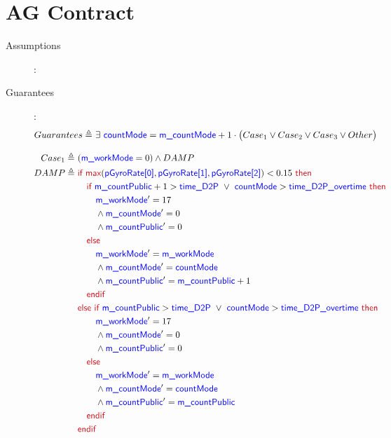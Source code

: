 \documentclass[fleqn,a4paper]{article}
\newcommand\Var[1]{\textcolor{blue}{\textsf{#1}}}
\newcommand\syntax[1]{\textcolor[RGB]{202,12,22}{\textsf{#1}}}
\newcommand\definedby{\triangleq}
\begin{document}
\newpage

\section{AG Contract}

\begin{description}

\item[Assumptions]: 

\item[Guarantees]:
\begin{align*}
Guarantees \definedby \
& \exists \ \Var{countMode} = \Var{m\_countMode} + 1 \cdot \big{(} Case_1 \vee Case_2\vee Case_3 \vee Other \big{)}
\end{align*}

\begin{align*}
Case_1 \definedby \
& (\Var{m\_workMode} = 0) \wedge DAMP \\
DAMP \definedby \
& \syntax{if } \syntax{max}(\Var{pGyroRate[0]}, \Var{pGyroRate[1]}, \Var{pGyroRate[2]}) < 0.15 \syntax{ then} \\
& \quad \syntax {if } \Var{m\_countPublic} + 1 > \Var{time\_D2P} \ \vee \ \Var{countMode} > \Var{time\_D2P\_overtime} \syntax{ then} \\
& \quad \quad \Var{m\_workMode}' = 17 \\
& \quad \quad \wedge \Var{m\_countMode}' = 0 \\
& \quad \quad \wedge \Var{m\_countPublic}' = 0 \\
& \quad \syntax{else} \\
& \quad \quad \Var{m\_workMode}' = \Var{m\_workMode} \\
& \quad \quad \wedge \Var{m\_countMode}' = \Var{countMode} \\
& \quad \quad \wedge \Var{m\_countPublic}' = \Var{m\_countPublic} + 1 \\
& \quad \syntax{endif} \\
& \syntax{else if } \Var{m\_countPublic} >\Var{time\_D2P} \ \vee \ \Var{countMode} > \Var{time\_D2P\_overtime} \syntax{ then} \\
& \quad \quad \Var{m\_workMode}' = 17 \\
& \quad \quad \wedge \Var{m\_countMode}' = 0 \\
& \quad \quad \wedge \Var{m\_countPublic}' = 0 \\
& \quad \syntax{else} \\
& \quad \quad \Var{m\_workMode}' = \Var{m\_workMode} \\
& \quad \quad \wedge \Var{m\_countMode}' = \Var{countMode} \\
& \quad \quad \wedge \Var{m\_countPublic}' = \Var{m\_countPublic} \\
& \quad \syntax{endif}\\
&\syntax{endif}
\end{align*}


\end{description}
\end{document}
